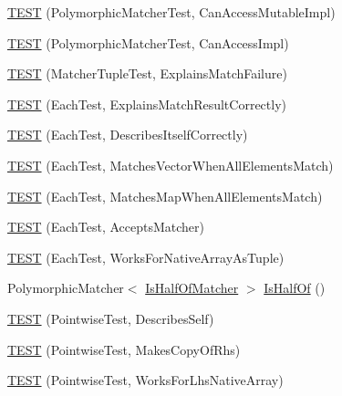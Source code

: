 \begin{DoxyCompactItemize}
\item 
\mbox{\hyperlink{namespacetesting_1_1gmock__matchers__test_ae29925e94a9396fe3c7fab6efaff8d8a}{T\+E\+ST}} (Polymorphic\+Matcher\+Test, Can\+Access\+Mutable\+Impl)
\item 
\mbox{\hyperlink{namespacetesting_1_1gmock__matchers__test_a918a64c4594ef6b30f53d735c2e6e6ac}{T\+E\+ST}} (Polymorphic\+Matcher\+Test, Can\+Access\+Impl)
\item 
\mbox{\hyperlink{namespacetesting_1_1gmock__matchers__test_abc9816afa3c83fc92e2c6ecfb2dd8e63}{T\+E\+ST}} (Matcher\+Tuple\+Test, Explains\+Match\+Failure)
\item 
\mbox{\hyperlink{namespacetesting_1_1gmock__matchers__test_adf46df588332aa839b52af952fface1a}{T\+E\+ST}} (Each\+Test, Explains\+Match\+Result\+Correctly)
\item 
\mbox{\hyperlink{namespacetesting_1_1gmock__matchers__test_a183c4b7acec060c6fe3dee650bc97e6d}{T\+E\+ST}} (Each\+Test, Describes\+Itself\+Correctly)
\item 
\mbox{\hyperlink{namespacetesting_1_1gmock__matchers__test_a1310e7e85bf8ea8f2281850167e15465}{T\+E\+ST}} (Each\+Test, Matches\+Vector\+When\+All\+Elements\+Match)
\item 
\mbox{\hyperlink{namespacetesting_1_1gmock__matchers__test_a53e7c1a04b8f178af52eeaa9f190cb64}{T\+E\+ST}} (Each\+Test, Matches\+Map\+When\+All\+Elements\+Match)
\item 
\mbox{\hyperlink{namespacetesting_1_1gmock__matchers__test_a74f7c802ddb6879d3c76ff08d3e242b9}{T\+E\+ST}} (Each\+Test, Accepts\+Matcher)
\item 
\mbox{\hyperlink{namespacetesting_1_1gmock__matchers__test_aef6eeafb03f698d16206836bbb6f05b9}{T\+E\+ST}} (Each\+Test, Works\+For\+Native\+Array\+As\+Tuple)
\item 
Polymorphic\+Matcher$<$ \mbox{\hyperlink{classtesting_1_1gmock__matchers__test_1_1IsHalfOfMatcher}{Is\+Half\+Of\+Matcher}} $>$ \mbox{\hyperlink{namespacetesting_1_1gmock__matchers__test_ace0a8f64b108c7a9c32c2cac15185461}{Is\+Half\+Of}} ()
\item 
\mbox{\hyperlink{namespacetesting_1_1gmock__matchers__test_a2c4c39058405e13e6c6b7fcf8e6bfe43}{T\+E\+ST}} (Pointwise\+Test, Describes\+Self)
\item 
\mbox{\hyperlink{namespacetesting_1_1gmock__matchers__test_a9be60ebc74e280d7eb6668bfa316a765}{T\+E\+ST}} (Pointwise\+Test, Makes\+Copy\+Of\+Rhs)
\item 
\mbox{\hyperlink{namespacetesting_1_1gmock__matchers__test_ad0e797104a482eba2d6c137cf9b676a5}{T\+E\+ST}} (Pointwise\+Test, Works\+For\+Lhs\+Native\+Array)

\end{DoxyCompactItemize}

